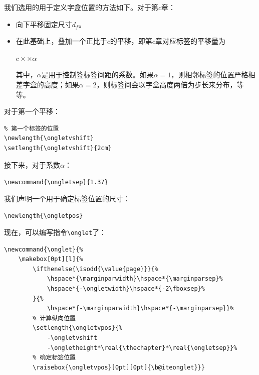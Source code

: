 我们选用的用于定义字盒位置的方法如下。对于第$c$章：

\begin{itemize}
    \item 向下平移固定尺寸$d_f$。
    \item 在此基础上，叠加一个正比于$c$的平移，即第$c$章对应标签的平移量为
    
    \begin{center}
        $c\times$$\times \alpha$
    \end{center}

    其中，$\alpha$是用于控制签标签间距的系数。如果$\alpha=1$，则相邻标签的位置严格相差字盒的高度；如果$\alpha=2$，则标签间会以字盒高度两倍为步长来分布，等等。
\end{itemize}

对于第一个平移：

\begin{dmd}
\begin{verbatim}
% 第一个标签的位置
\newlength{\ongletvshift}
\setlength{\ongletvshift}{2cm}\end{verbatim}
\end{dmd}

接下来，对于系数$\alpha$：

\begin{dmd}
\verb+\newcommand{\ongletsep}{1.37}+
\end{dmd}

我们声明一个用于确定标签位置的尺寸：

\begin{dmd}
\verb|\newlength{\ongletpos}|
\end{dmd}

现在，可以编写指令\verb|\onglet|了：

\begin{dmd}
\begin{verbatim}
\newcommand{\onglet}{% 
    \makebox[0pt][l]{%
        \ifthenelse{\isodd{\value{page}}}{% 
            \hspace*{\marginparwidth}\hspace*{\marginparsep}% 
            \hspace*{-\ongletwidth}\hspace*{-2\fboxsep}%
        }{% 
            \hspace*{-\marginparwidth}\hspace*{-\marginparsep}}%
        % 计算纵向位置
        \setlength{\ongletvpos}{%
            -\ongletvshift
            -\ongletheight*\real{\thechapter}*\real{\ongletsep}}% 
        % 确定标签位置 
        \raisebox{\ongletvpos}[0pt][0pt]{\b@iteonglet}}}\end{verbatim}
\end{dmd}

